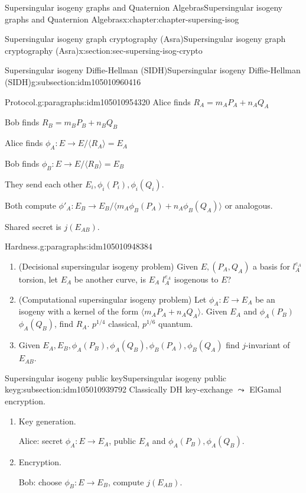 \documentclass[oneside,10pt,]{book}
\numberwithin{equation}{section}
\begin{document}
\begin{chapterptx}{Supersingular isogeny graphs and Quaternion Algebras}{}{Supersingular isogeny graphs and Quaternion Algebras}{}{}{x:chapter:chapter-supersing-isog}
\begin{sectionptx}{Supersingular isogeny graph cryptography (Asra)}{}{Supersingular isogeny graph cryptography (Asra)}{}{}{x:section:sec-supersing-isog-crypto}
\begin{subsectionptx}{Supersingular isogeny Diffie-Hellman (SIDH)}{}{Supersingular isogeny Diffie-Hellman (SIDH)}{}{}{g:subsection:idm105010960416}
\begin{paragraphs}{Protocol.}{g:paragraphs:idm105010954320}
Alice finds \(R_A = m_AP_A + n_AQ_A\)%
\par
Bob finds \(R_B = m_BP_B + n_BQ_B\)%
\par
Alice finds \(\phi_A \colon E \to E/\langle R_A\rangle = E_A\)%
\par
Bob finds \(\phi_B \colon E \to E/\langle R_B\rangle = E_B\)%
\par
They send each other \(E_i, \phi_i(P_i),\phi_i(Q_i)\).%
\par
Both compute \(\phi'_A\colon E_B \to E_B/\langle m_A\phi_B(P_A) + n_A\phi_B(Q_A)\rangle\) or analogous.%
\par
Shared secret is \(j(E_{AB})\).%
\end{paragraphs}%
\begin{paragraphs}{Hardness.}{g:paragraphs:idm105010948384}%
%
\begin{enumerate}
\item{}(Decisional supersingular isogeny problem) Given \(E, (P_A,Q_A)\) a basis for \(l_A^{e_A}\) torsion, let \(E_A\) be another curve, is \(E_A\) \(l_A^{e_A}\) isogenous to \(E\)?%
\item{}(Computational supersingular isogeny problem) Let \(\phi_A \colon E \to E_A\) be an isogeny with a kernel of the form \(\langle m_AP_A + n_AQ_A \rangle\). Given \(E_A\) and \(\phi_A(P_B)\) \(\phi_A(Q_B)\), find \(R_A\). \(p^{1/4}\) classical, \(p^{1/6}\) quantum.%
\item{}Given \(E_A, E_B, \phi_A(P_B), \phi_A(Q_B), \phi_B(P_A), \phi_B(Q_A)\) find \(j\)-invariant of \(E_{AB}\).%
\end{enumerate}
%
\end{paragraphs}%
\end{subsectionptx}
%
%
\typeout{************************************************}
\typeout{************************************************}
%
\begin{subsectionptx}{Supersingular isogeny public key}{}{Supersingular isogeny public key}{}{}{g:subsection:idm105010939792}
Classically DH key-exchange \(\leadsto\) ElGamal encryption.%
\par
%
\begin{enumerate}
\item{}Key generation.%
\par
Alice: secret \(\phi_A \colon E \to E_A\), public \(E_A\) and \(\phi_A(P_B), \phi_A(Q_B)\).%
\item{}Encryption.%
\par
Bob: choose \(\phi_B \colon E \to E_B\), compute \(j(E_{AB})\).%

\end{enumerate}
\end{subsectionptx}
\end{sectionptx}
\end{chapterptx}
\end{document}
